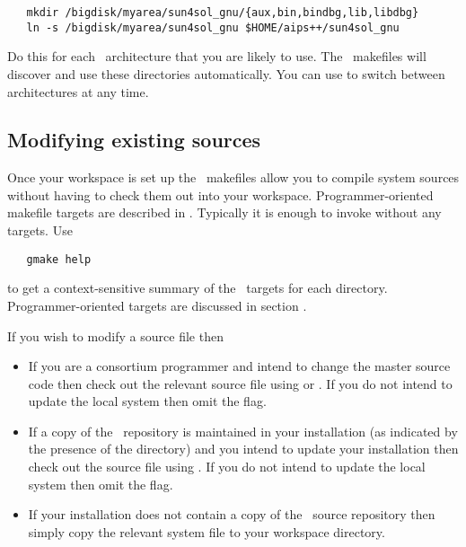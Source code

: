\begin{verbatim}
   mkdir /bigdisk/myarea/sun4sol_gnu/{aux,bin,bindbg,lib,libdbg}
   ln -s /bigdisk/myarea/sun4sol_gnu $HOME/aips++/sun4sol_gnu
\end{verbatim}

\noindent
Do this for each \aipspp\ architecture that you are likely to use.  The
\aipspp\ makefiles will discover and use these directories automatically.  You
can use  to switch between architectures at any time.

\subsection*{Modifying existing sources}

Once your workspace is set up the \aipspp\ makefiles allow you to compile
system sources without having to check them out into your workspace.
Programmer-oriented makefile targets are described in .  Typically it is enough to invoke  without
any targets.  Use

\begin{verbatim}
   gmake help
\end{verbatim}

\noindent
to get a context-sensitive summary of the \aipspp\ targets for each directory.
Programmer-oriented targets are discussed in section .

If you wish to modify a source file then

\begin{itemize}
\item
   If you are a consortium programmer and intend to change the master source
   code then check out the relevant source file using  or
   .  If you do not intend to update the local system
   then omit the  flag.
\item
   If a copy of the \rcs\ repository is maintained in your installation (as
   indicated by the presence of the  directory) and you
   intend to update your installation then check out the source file using
   .  If you do not intend to update the local system then omit
   the  flag.
\item
   If your installation does not contain a copy of the \rcs\ source repository
   then simply copy the relevant system file to your workspace directory.
\end{itemize}

